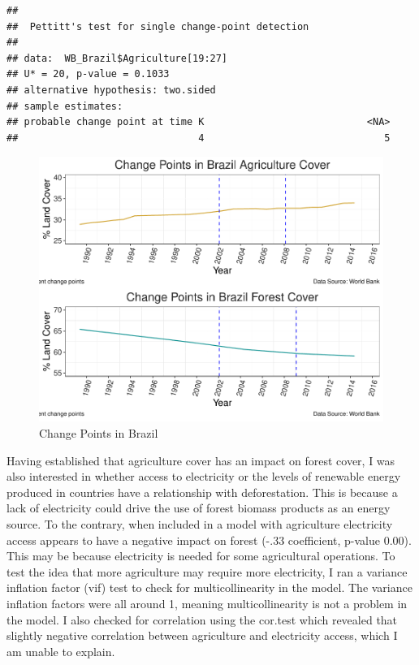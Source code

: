 \documentclass[12pt,]{article}
\newenvironment{Shaded}{\begin{snugshade}}{\end{snugshade}}
\newcommand{\CommentTok}[1]{\textcolor[rgb]{0.56,0.35,0.01}{\textit{#1}}}
\begin{document}
\begin{verbatim}
## 
##  Pettitt's test for single change-point detection
## 
## data:  WB_Brazil$Agriculture[19:27]
## U* = 20, p-value = 0.1033
## alternative hypothesis: two.sided
## sample estimates:
## probable change point at time K                            <NA> 
##                               4                               5
\end{verbatim}

\begin{Shaded}
\end{Shaded}

\begin{figure}
\centering
\includegraphics{Marx_ENV872_Project_files/figure-latex/unnamed-chunk-9-1.pdf}
\caption{\label{fig:fig5}Change Points in Brazil}
\end{figure}

Having established that agriculture cover has an impact on forest cover,
I was also interested in whether access to electricity or the levels of
renewable energy produced in countries have a relationship with
deforestation. This is because a lack of electricity could drive the use
of forest biomass products as an energy source. To the contrary, when
included in a model with agriculture electricity access appears to have
a negative impact on forest (-.33 coefficient, p-value 0.00). This may
be because electricity is needed for some agricultural operations. To
test the idea that more agriculture may require more electricity, I ran
a variance inflation factor (vif) test to check for multicollinearity in
the model. The variance inflation factors were all around 1, meaning
multicollinearity is not a problem in the model. I also checked for
correlation using the cor.test which revealed that slightly negative
correlation between agriculture and electricity access, which I am
unable to explain.
\end{document}
